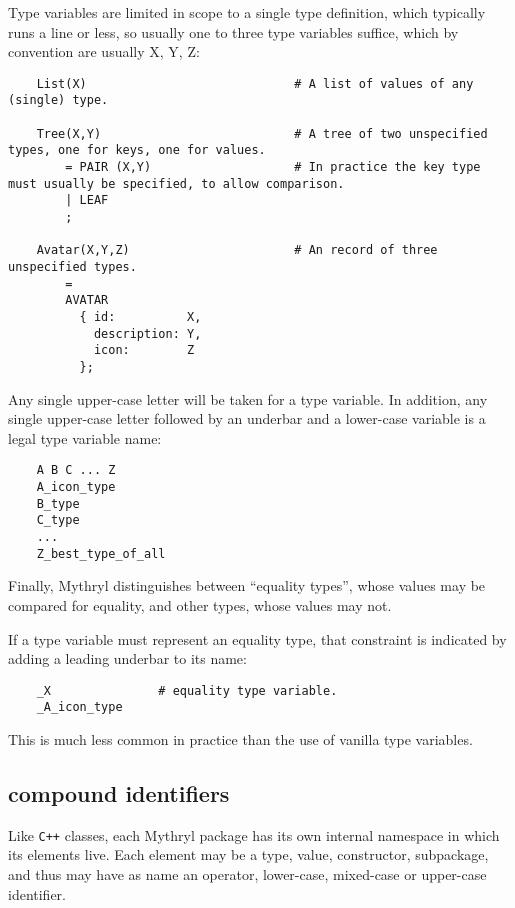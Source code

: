 Type variables are limited in scope to a single type 
definition, which typically runs a line or less, so 
usually one to three type variables suffice, which 
by convention are usually X, Y, Z:

\begin{verbatim}
    List(X)                             # A list of values of any (single) type.

    Tree(X,Y)                           # A tree of two unspecified types, one for keys, one for values.
        = PAIR (X,Y)                    # In practice the key type must usually be specified, to allow comparison.
        | LEAF
        ;

    Avatar(X,Y,Z)                       # An record of three unspecified types.
        =
        AVATAR
          { id:          X,
            description: Y,
            icon:        Z
          };
\end{verbatim}

Any single upper-case letter will be taken for a type variable. 
In addition, any single upper-case letter followed by an underbar 
and a lower-case variable is a legal type variable name:


\begin{verbatim}
    A B C ... Z
    A_icon_type
    B_type
    C_type
    ...
    Z_best_type_of_all
\end{verbatim}


Finally, Mythryl distinguishes between ``equality types'', whose values 
may be compared for equality, and other types, whose values may not.

If a type variable must represent an equality type, that constraint is 
indicated by adding a leading underbar to its name:

\begin{verbatim}
    _X               # equality type variable.
    _A_icon_type
\end{verbatim}

This is much less common in practice than the use of vanilla type variables.


\cutend*

\subsection{compound identifiers}
\label{section:ref:identifiers:compound-identifier}

Like {\tt C++} classes, each Mythryl package has its own internal namespace 
in which its elements live.  Each element may be a type, value, constructor, 
subpackage, and thus may have as name an operator, lower-case, mixed-case 
or upper-case identifier.

